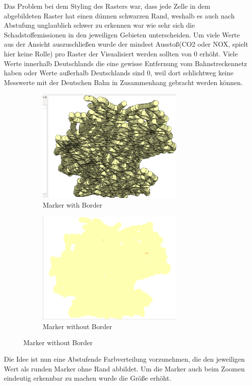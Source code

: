Das Problem bei dem Styling des  Rasters war, dass jede Zelle in dem abgebildeten Raster hat einen dünnen schwarzen Rand, weshalb es auch nach Abstufung unglaublich schwer zu erkennen war wie sehr sich die Schadstoffemissionen in den jeweiligen Gebieten unterscheiden. Um viele Werte aus der Ansicht auszuschließen wurde der mindest Ausstoß(CO2 oder NOX, spielt hier keine Rolle)  pro Raster der Visualisiert werden sollten von 0 erhöht. Viele Werte innerhalb Deutschlands die eine gewisse Entfernung vom Bahnstreckennetz haben oder Werte außerhalb Deutschlands sind 0, weil dort schlichtweg keine Messwerte mit der Deutschen Bahn in Zusammenhang gebracht werden können.
\begin{figure}[h]
	\begin{subfigure}[b]{0.5\textwidth}
	\centering
	\includegraphics[width=0.8\textwidth]{images/Marker_Border.png}
	\caption{Marker with Border}
\end{subfigure}
	\begin{subfigure}[b]{0.5\textwidth}
	\centering
	\includegraphics[width=0.8\textwidth]{images/Marker_noBorder.png}
	\caption{Marker without Border}
\end{subfigure}
\end{figure}
Die Idee ist nun eine Abstufende Farbverteilung vorzunehmen, die den jeweiligen Wert als runden Marker ohne Rand abbildet. Um die Marker auch beim Zoomen eindeutig erkennbar zu machen wurde die Größe erhöht.


